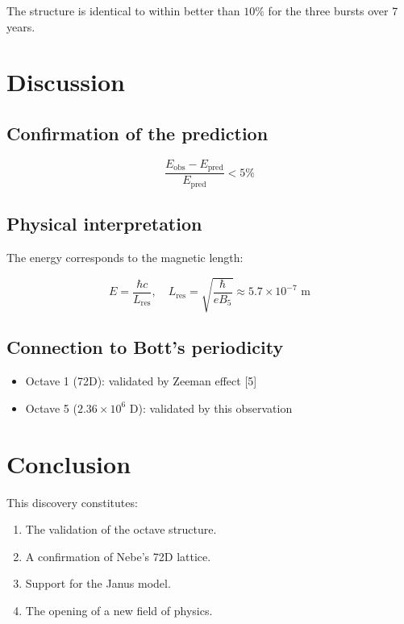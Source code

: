 \documentclass[11pt]{article}
\providecommand{\tightlist}{%
\setlength{\itemsep}{2pt}\setlength{\parskip}{6pt}
}
\begin{document}
The structure is identical to within better than \(10\%\) for the three
bursts over 7 years.

\hypertarget{discussion}{%
\section{Discussion}\label{discussion}}

\hypertarget{confirmation-of-the-prediction}{%
\subsection{Confirmation of the
prediction}\label{confirmation-of-the-prediction}}

\[\frac{E_{\text{obs}} - E_{\text{pred}}}{E_{\text{pred}}} < 5\%\]

\hypertarget{physical-interpretation}{%
\subsection{Physical interpretation}\label{physical-interpretation}}

The energy corresponds to the magnetic length:

\[E = \frac{\hbar c}{L_{\text{res}}}, \quad L_{\text{res}} = \sqrt{\frac{\hbar}{e B_5}} \approx 5.7 \times 10^{-7} \text{ m}\]

\hypertarget{connection-to-botts-periodicity}{%
\subsection{Connection to Bott's
periodicity}\label{connection-to-botts-periodicity}}

\begin{itemize}
\tightlist
\item
  Octave 1 (72D): validated by Zeeman effect {[}5{]}
\item
  Octave 5 (\(2.36\times10^6\) D): validated by this observation
\end{itemize}

\hypertarget{conclusion-1}{%
\section{Conclusion}\label{conclusion-1}}

This discovery constitutes:

\begin{enumerate}
\def\labelenumi{\arabic{enumi}.}
\tightlist
\item
  The validation of the octave structure.
\item
  A confirmation of Nebe's 72D lattice.
\item
  Support for the Janus model.
\item
  The opening of a new field of physics.
\end{enumerate}
\end{document}
